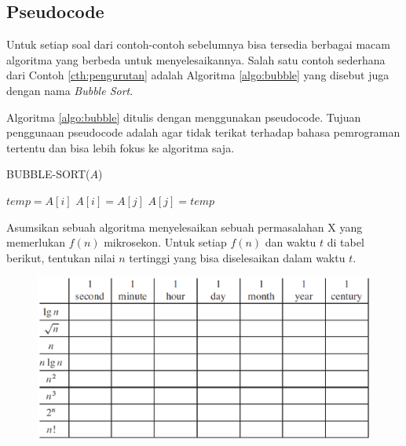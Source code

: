 \subsection{Pseudocode}
Untuk setiap soal dari contoh-contoh sebelumnya bisa tersedia berbagai macam algoritma yang berbeda untuk menyelesaikannya. Salah satu contoh sederhana dari Contoh \ref{cth:pengurutan} adalah Algoritma \ref{algo:bubble} yang disebut juga dengan nama \textit{Bubble Sort}. 

Algoritma \ref{algo:bubble} ditulis dengan menggunakan pseudocode. Tujuan penggunaan pseudocode adalah agar tidak terikat terhadap bahasa pemrograman tertentu dan bisa lebih fokus ke algoritma saja.

\begin{algorithm}
	\caption{BUBBLE-SORT($A$)}
	\label{algo:bubble}
	\begin{algorithmic}[1]
			\STATE $temp = A[i]$
			\STATE $A[i] = A[j]$
			\STATE $A[j] = temp$
			\ENDIF
		\ENDFOR
	\ENDFOR
	\end{algorithmic}
\end{algorithm}


\begin{konsep}
Asumsikan sebuah algoritma menyelesaikan sebuah permasalahan X yang memerlukan $f(n)$ mikrosekon. Untuk setiap $f(n)$ dan waktu $t$ di tabel berikut, tentukan nilai $n$ tertinggi yang bisa diselesaikan dalam waktu $t$.
\begin{figure}%
\centering
\includegraphics[scale=0.5]{fig/tableEksekusi.eps}%
\end{figure}
\end{konsep}

